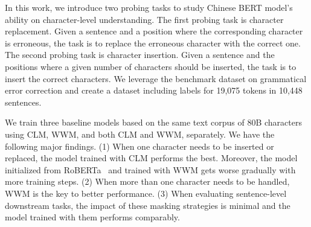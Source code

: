 \documentclass[11pt]{article}
\begin{document}
In this work, we introduce two probing tasks
to study Chinese BERT model's ability on character-level understanding. 
The first probing task is character replacement.
Given a sentence and a position where the corresponding character is erroneous, the task is to 
replace the erroneous character with the correct one.
The second probing task is character insertion. 
Given a sentence and the positions where a given number of characters should be inserted, the task is to insert the correct characters.
We leverage the benchmark dataset on grammatical error correction \cite{rao2020overview} and create a dataset including labels for 19,075 tokens in 10,448 sentences. 

We train three baseline models based on the same text corpus of 80B characters using CLM, WWM, and both CLM and WWM, separately. We have the following major findings. (1) When one character needs to be inserted or replaced, the model trained with CLM performs the best. Moreover, the model initialized from RoBERTa~\cite{cui2019pre} and trained with WWM gets worse gradually with more training steps. (2) When more than one character needs to be handled, WWM is the key to better performance. (3) When evaluating sentence-level downstream tasks, the impact of these masking strategies is minimal and the model trained with them performs comparably. 

\end{document}
